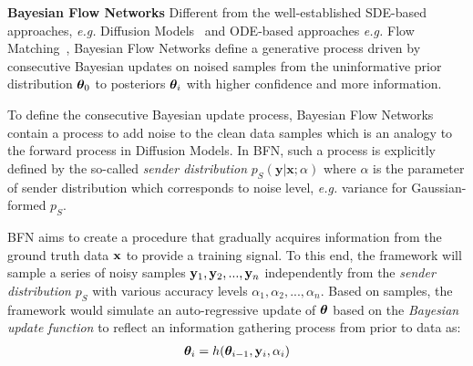 \textbf{Bayesian Flow Networks}
Different from the well-established SDE-based approaches, \emph{e.g.} Diffusion Models~\citep{ddpm,sde,song2020score} and ODE-based approaches \emph{e.g.} Flow Matching~\citep{flowmatching}, Bayesian Flow Networks define a generative process driven by consecutive Bayesian updates on noised samples from the uninformative prior distribution ${\bm{\theta}}_{0}$ to posteriors ${\bm{\theta}}_i$ with higher confidence and more information.


To define the consecutive Bayesian update process, Bayesian Flow Networks contain a process to add noise to the clean data samples which is an analogy to the forward process in Diffusion Models. In BFN, such a process is explicitly defined by the so-called \emph{sender distribution} $p_S(\mathbf{y}|\mathbf{x};\alpha)$ where $\alpha$ is the parameter of sender distribution which corresponds to noise level, \emph{e.g.} variance for Gaussian-formed $p_S$. 

 BFN aims to create a procedure that gradually acquires information from the ground truth data \({\mathbf{x}}\) to provide a training signal. To this end, the framework will sample a series of noisy samples $\bold{y}_1, \bold{y}_2, ..., \bold{y}_n$  independently from the \emph{sender distribution} $p_S$ with various accuracy levels $\alpha_1, \alpha_2, ..., \alpha_n$. Based on samples, the framework would simulate an auto-regressive update of ${\bm{\theta}}$ based on the \emph{Bayesian update function} to reflect an information gathering process from prior to data as:
\begin{align}
    \label{eq:bayesian_update}
    {\bm{\theta}}_i = h(\boldsymbol{\theta}_{i-1},\bold{y}_{i},\alpha_{i})
\end{align}


